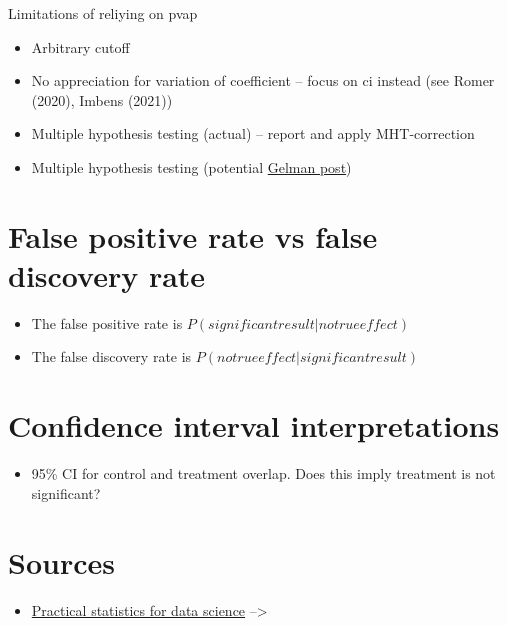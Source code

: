 \documentclass[
  letterpaper,
  DIV=11,
  numbers=noendperiod]{scrreprt}
\providecommand{\tightlist}{%
  \setlength{\itemsep}{0pt}\setlength{\parskip}{0pt}}\usepackage{longtable,booktabs,array}
\begin{document}
Limitations of reliying on pvap

\begin{itemize}
\item
  Arbitrary cutoff
\item
  No appreciation for variation of coefficient -- focus on ci instead
  (see Romer (2020), Imbens (2021))
\item
  Multiple hypothesis testing (actual) -- report and apply
  MHT-correction
\item
  Multiple hypothesis testing (potential
  \href{https://statmodeling.stat.columbia.edu/2016/03/07/29212/}{Gelman
  post})
\end{itemize}

\hypertarget{false-positive-rate-vs-false-discovery-rate}{%
\section{False positive rate vs false discovery
rate}\label{false-positive-rate-vs-false-discovery-rate}}

\begin{itemize}
\item
  The false positive rate is \(P(significant result|no true effect)\)
\item
  The false discovery rate is \(P(no true effect|significant result)\)
\end{itemize}

\hypertarget{confidence-interval-interpretations}{%
\section{Confidence interval
interpretations}\label{confidence-interval-interpretations}}

\begin{itemize}
\tightlist
\item
  95\% CI for control and treatment overlap. Does this imply treatment
  is not significant?
\end{itemize}

\hypertarget{sources}{%
\section{Sources}\label{sources}}

\begin{itemize}
\tightlist
\item
  \href{https://learning.oreilly.com/library/view/practical-statistics-for/9781492072935/}{Practical
  statistics for data science} --\textgreater{}
\end{itemize}
\end{document}
